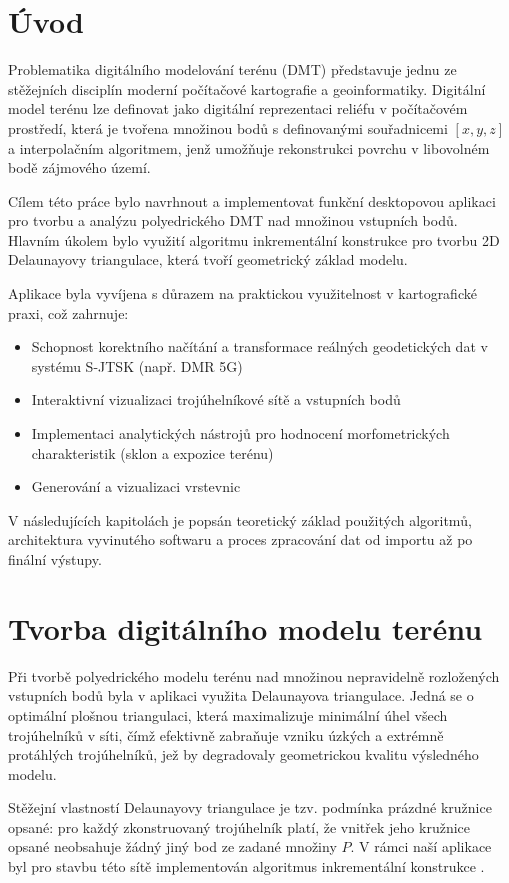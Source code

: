 \documentclass[12pt, a4paper]{article}
\begin{document}
\newpage


\section{Úvod}
Problematika digitálního modelování terénu (DMT) představuje jednu ze stěžejních disciplín moderní počítačové kartografie a geoinformatiky. Digitální model terénu lze definovat jako digitální reprezentaci reliéfu v počítačovém prostředí, která je tvořena množinou bodů s definovanými souřadnicemi $[x, y, z]$ a interpolačním algoritmem, jenž umožňuje rekonstrukci povrchu v libovolném bodě zájmového území.

Cílem této práce bylo navrhnout a implementovat funkční desktopovou aplikaci pro tvorbu a analýzu polyedrického DMT nad množinou vstupních bodů. Hlavním úkolem bylo využití algoritmu inkrementální konstrukce pro tvorbu 2D Delaunayovy triangulace, která tvoří geometrický základ modelu.

Aplikace byla vyvíjena s důrazem na praktickou využitelnost v kartografické praxi, což zahrnuje:
\begin{itemize}
    \item Schopnost korektního načítání a transformace reálných geodetických dat v systému S-JTSK (např. DMR 5G)
    \item Interaktivní vizualizaci trojúhelníkové sítě a vstupních bodů
    \item Implementaci analytických nástrojů pro hodnocení morfometrických charakteristik (sklon a expozice terénu)
    \item Generování a vizualizaci vrstevnic
\end{itemize}

V následujících kapitolách je popsán teoretický základ použitých algoritmů, architektura vyvinutého softwaru a proces zpracování dat od importu až po finální výstupy.

\section{Tvorba digitálního modelu terénu}
Při tvorbě polyedrického modelu terénu nad množinou nepravidelně rozložených vstupních bodů byla v aplikaci využita Delaunayova triangulace. Jedná se o optimální plošnou triangulaci, která maximalizuje minimální úhel všech trojúhelníků v síti, čímž efektivně zabraňuje vzniku úzkých a extrémně protáhlých trojúhelníků, jež by degradovaly geometrickou kvalitu výsledného modelu. 

Stěžejní vlastností Delaunayovy triangulace je tzv. podmínka prázdné kružnice opsané: pro každý zkonstruovaný trojúhelník platí, že vnitřek jeho kružnice opsané neobsahuje žádný jiný bod ze zadané množiny $P$. V rámci naší aplikace byl pro stavbu této sítě implementován algoritmus inkrementální konstrukce \parencite{bayer}.
\end{document}

